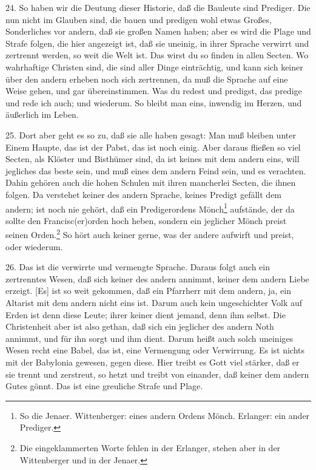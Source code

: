 24. So haben wir die Deutung dieser Historie, daß die Bauleute sind Prediger. Die nun nicht im Glauben sind, die bauen und predigen wohl etwas Großes, Sonderliches vor andern, daß sie großen Namen haben; aber es wird die Plage und Strafe folgen, die hier angezeigt ist, daß sie uneinig, in ihrer Sprache verwirrt und zertrennt werden, so weit die Welt ist. Das wirst du so finden in allen Secten. Wo wahrhaftige Christen sind, die sind aller Dinge einträchtig, und kann sich keiner über den andern erheben noch sich zertrennen, da muß die Sprache auf eine Weise gehen, und gar übereinstimmen. Was du redest und predigst, das predige und rede ich auch; und wiederum. So bleibt man eins, inwendig im Herzen, und äußerlich im Leben.

25. Dort aber geht es so zu, daß sie alle haben gesagt: Man muß bleiben unter Einem Haupte, das ist der Pabst, das ist noch einig. Aber daraus fließen so viel Secten, als Klöster und Bisthümer sind, da ist keines mit dem andern eins, will jegliches das beste sein, und muß eines dem andern Feind sein, und es verachten. Dahin gehören auch die hohen Schulen mit ihren mancherlei Secten, die ihnen folgen. Da verstehet keiner des andern Sprache, keines Predigt gefällt dem andern; ist noch nie gehört, daß ein Predigerordens Mönch\footnote{So die Jenaer. Wittenberger: eines andern Ordens Mönch. Erlanger: ein ander Prediger.} aufstände, der da sollte den Francisc(er)orden hoch heben, sondern ein jeglicher Mönch preist seinen Orden.\footnote{Die eingeklammerten Worte fehlen in der Erlanger, stehen aber in der Wittenberger und in der Jenaer.} So hört auch keiner gerne, was der andere aufwirft und preist, oder wiederum.

26. Das ist die verwirrte und vermengte Sprache. Daraus folgt auch ein zertrenntes Wesen, daß sich keiner des andern annimmt, keiner dem andern Liebe erzeigt. [Es] ist so weit gekommen, daß ein Pfarrherr mit dem andern, ja, ein Altarist mit dem andern nicht eins ist. Darum auch kein ungeschichter Volk auf Erden ist denn diese Leute; ihrer keiner dient jemand, denn ihm selbst. Die Christenheit aber ist also gethan, daß sich ein jeglicher des andern Noth annimmt, und für ihn sorgt und ihm dient. Darum heißt auch solch uneiniges Wesen recht eine Babel, das ist, eine Vermengung oder Verwirrung. Es ist nichts mit der Babylonia gewesen, gegen diese. Hier treibt es Gott viel stärker, daß er sie trennt und zerstreut, so hetzt und treibt von einander, daß keiner dem andern Gutes gönnt. Das ist eine greuliche Strafe und Plage.

